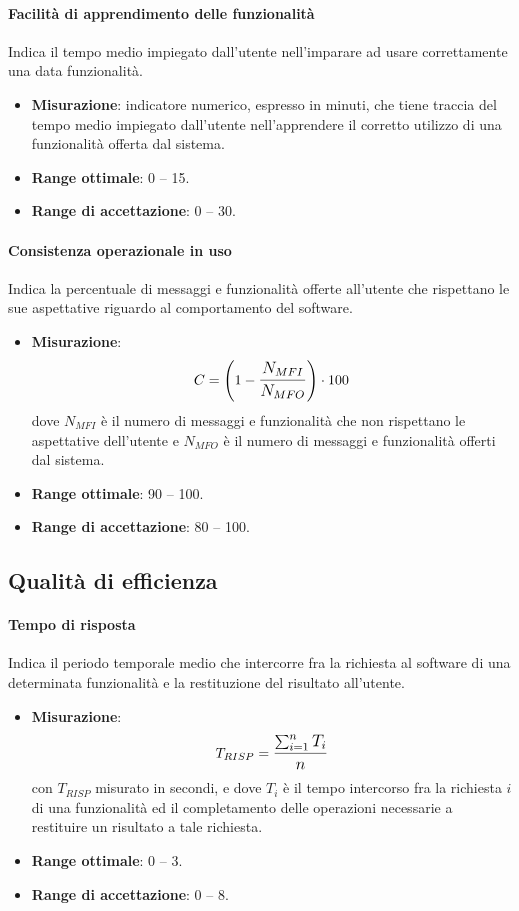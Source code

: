 \paragraph{Facilità di apprendimento delle funzionalità}
Indica il tempo medio impiegato dall'utente nell'imparare ad usare correttamente una data funzionalità.
\begin{itemize}
	\item \textbf{Misurazione}: indicatore numerico, espresso in minuti, che tiene traccia del tempo medio impiegato dall'utente nell'apprendere il corretto utilizzo di una funzionalità offerta dal sistema.
	\item \textbf{Range ottimale}: 0 -- 15.
	\item \textbf{Range di accettazione}: 0 -- 30.
\end{itemize}

\paragraph{Consistenza operazionale in uso}
Indica la percentuale di messaggi e funzionalità offerte all'utente che rispettano le sue aspettative riguardo al comportamento del software.
\begin{itemize}
	\item \textbf{Misurazione}: 
		$$C=\left(1-\mathlarger{\frac{N_{MFI}}{N_{MFO}}}\right) \cdot 100$$
	dove $N_{MFI}$ è il numero di messaggi e funzionalità che non rispettano le aspettative dell'utente e $N_{MFO}$ è il numero di messaggi e funzionalità offerti dal sistema.
	\item \textbf{Range ottimale}: 90 -- 100.
	\item \textbf{Range di accettazione}: 80 -- 100.
\end{itemize}

\subsection{Qualità di efficienza}

\paragraph{Tempo di risposta}
Indica il periodo temporale medio che intercorre fra la richiesta al software di una determinata funzionalità e la restituzione del risultato all'utente.
\begin{itemize}
	\item \textbf{Misurazione}: 
		$$T_{RISP} = \mathlarger{\frac{\sum_{i=1}^{n} T_{i}}{n}}$$ 
	con $T_{RISP}$ misurato in secondi, e dove $T_{i}$ è il tempo intercorso fra la richiesta $i$ di una funzionalità ed il completamento delle operazioni necessarie a restituire un risultato a tale richiesta.
	\item \textbf{Range ottimale}: 0 -- 3.
	\item \textbf{Range di accettazione}: 0 -- 8.
\end{itemize}
